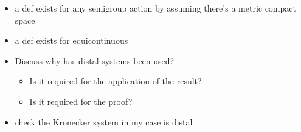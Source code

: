 \documentclass[
  british,
]{article}
\providecommand{\tightlist}{%
  \setlength{\itemsep}{0pt}\setlength{\parskip}{0pt}}
\theoremstyle{plain}
\theoremstyle{definition}
\theoremstyle{plain}
\theoremstyle{remark}
\begin{document}
\begin{itemize}
\begin{itemize}
    \begin{itemize}
    \tightlist
    \item
      A topological system \((X,T)\) is \textbf{distal} if
      \[\inf\{d(T^nx,T^ny):n\in\mathbb{N}\}>0 \] for all
      \(x\neq y\in X\), where \(d\) is the metric on \(X\).
      ()
    \end{itemize}
  \item
    a def exists for any semigroup action by assuming there's a metric
    compact space
  \item
    a def exists for equicontinuous
  \item
    Discuss why has distal systems been used?

    \begin{itemize}
    \tightlist
    \item
      Is it required for the application of the result?
    \item
      Is it required for the proof?
    \end{itemize}
  \item
    check the Kronecker system in my case is distal
  \end{itemize}
\end{itemize}
\end{document}
